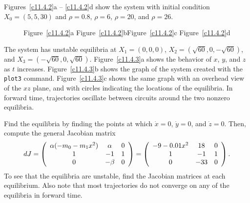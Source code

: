 \para Figures~\ref{c11.4.2}a -- \ref{c11.4.2}d show the system with
initial condition $X_0 = (5,5,30)$ and $\rho = 0.8$, $\rho = 6$, $\rho = 20$,
and $\rho = 26$.

\begin{figure}[htb]
                       \centerline{%
                       }
		\centerline{Figure~\ref{c11.4.2}a\hspace{0.8in}
        	Figure~\ref{c11.4.2}b\hspace{0.8in}Figure~\ref{c11.4.2}c
        	\hspace{0.8in}Figure~\ref{c11.4.2}d}
\end{figure}


\ans The system has unstable equilibria at $X_1 = (0,0,0)$,
$X_2 = (\sqrt{60},0, -\sqrt{60})$, and $X_3 = (-\sqrt{60},0,\sqrt{60})$.
Figure~\ref{c11.4.3}a shows the behavior of $x$, $y$, and $z$ as $t$
increases.  Figure~\ref{c11.4.3}b shows the graph of the system created
with the {\tt plot3} command.  Figure~\ref{c11.4.3}c shows the same graph
with an overhead view of the $xz$ plane, and with circles indicating the
locations of the equilibria.  In forward time, trajectories oscillate
between circuits around the two nonzero equilibria.

\soln Find the equilibria by finding the points at which $\dot{x} = 0$,
$\dot{y} = 0$, and $\dot{z} = 0$.  Then, compute the general Jacobian
matrix
\[
dJ = \left(\begin{array}{ccc} \alpha(-m_0 - m_1x^2) & \alpha & 0 \\ 1 & -1 & 1 \\ 0 & -\beta & 0\end{array}\right)
= \left(\begin{array}{ccc} -9 - 0.01x^2 & 18 & 0 \\ 1 & -1 & 1 \\ 0 & -33 & 0\end{array}\right).
\]
To see that the equilibria are unstable, find the Jacobian matrices at
each equilibrium.  Also note that most trajectories do not converge on
any of the equilibria in forward time.

\begin{figure}[htb]
                       \centerline{%
			\hspace{0.5in}
			\hspace{0.3in}
                       }
\end{figure}

